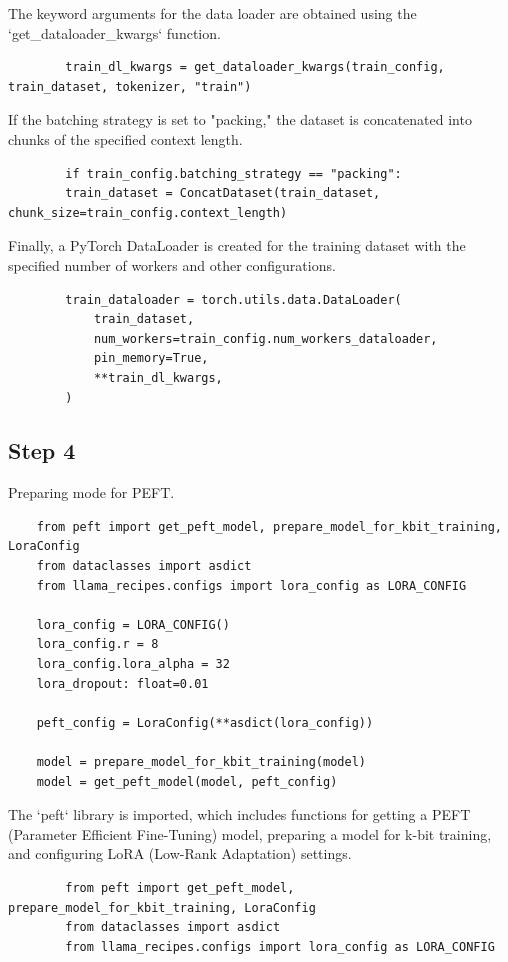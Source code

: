 \documentclass{solutionclass} %
\begin{document}
\begin{solution}
	The keyword arguments for the data loader are obtained using the `get\_dataloader\_kwargs` function.
	\begin{lstlisting}
		train_dl_kwargs = get_dataloader_kwargs(train_config, train_dataset, tokenizer, "train")
	\end{lstlisting}
\end{solution}

\begin{solution}
	If the batching strategy is set to "packing," the dataset is concatenated into chunks of the specified context length.
	\begin{lstlisting}
		if train_config.batching_strategy == "packing":
		train_dataset = ConcatDataset(train_dataset, chunk_size=train_config.context_length)
	\end{lstlisting}
\end{solution}

\begin{solution}
	Finally, a PyTorch DataLoader is created for the training dataset with the specified number of workers and other configurations.
	\begin{lstlisting}
		train_dataloader = torch.utils.data.DataLoader(
			train_dataset,
			num_workers=train_config.num_workers_dataloader,
			pin_memory=True,
			**train_dl_kwargs,
		)
		\end{lstlisting}
	
\end{solution}

\subsection*{Step 4}

Preparing mode for PEFT.

\begin{lstlisting}
	from peft import get_peft_model, prepare_model_for_kbit_training, LoraConfig
	from dataclasses import asdict
	from llama_recipes.configs import lora_config as LORA_CONFIG
	
	lora_config = LORA_CONFIG()
	lora_config.r = 8
	lora_config.lora_alpha = 32
	lora_dropout: float=0.01
	
	peft_config = LoraConfig(**asdict(lora_config))
	
	model = prepare_model_for_kbit_training(model)
	model = get_peft_model(model, peft_config)
\end{lstlisting}


\begin{solution}
	The `peft` library is imported, which includes functions for getting a PEFT (Parameter Efficient Fine-Tuning) model, preparing a model for k-bit training, and configuring LoRA (Low-Rank Adaptation) settings.
	\begin{lstlisting}
		from peft import get_peft_model, prepare_model_for_kbit_training, LoraConfig
		from dataclasses import asdict
		from llama_recipes.configs import lora_config as LORA_CONFIG
	\end{lstlisting}
\end{solution}
\end{document}
